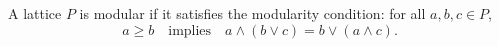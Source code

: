 A lattice $P$ is modular if it satisfies the modularity condition: for all $a, b, c \in P$,
$$a \geq b \quad \text{implies} \quad a \wedge (b \vee c) = b \vee (a \wedge c).$$
